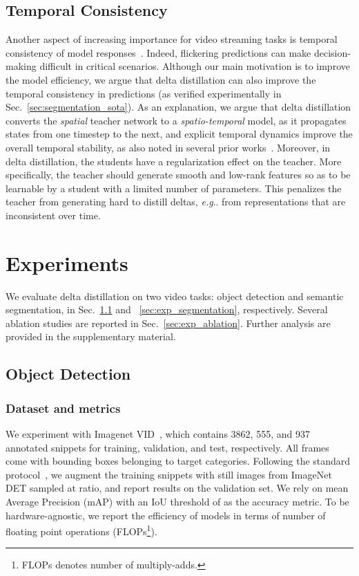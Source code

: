 \documentclass[runningheads]{llncs}
\makeatletter
\DeclareRobustCommand\onedot{\futurelet\@let@token\@onedot}
\def\@onedot{\ifx\@let@token.\else.\null\fi\xspace}
\def\eg{\emph{e.g}\onedot} \def\Eg{\emph{E.g}\onedot}
\makeatother
\begin{document}
\subsection{Temporal Consistency}
\label{sec:tc}
Another aspect of increasing importance for video streaming tasks is temporal consistency of model responses~\cite{lei2020blind,liu2020efficient,Rebol_2020_ACVRW}. Indeed, flickering predictions can make decision-making difficult in critical scenarios.
Although our main motivation is to improve the model efficiency, we argue that delta distillation can also improve the temporal consistency in predictions (as verified experimentally in Sec.~\ref{sec:segmentation_sota}).
As an explanation, we argue that delta distillation converts the \emph{spatial} teacher network to a \emph{spatio-temporal} model, as it propagates states from one timestep to the next, and explicit temporal dynamics improve the overall temporal stability, as also noted in several prior works~\cite{Rebol_2020_ACVRW,sibechi2019exploiting}.
Moreover, in delta distillation, the students have a regularization effect on the teacher.
More specifically, the teacher should generate smooth and low-rank features so as to be learnable by a student with a limited number of parameters. 
This penalizes the teacher from generating hard to distill deltas, \eg from representations that are inconsistent over time. \section{Experiments}
\label{sec:experiments}
We evaluate delta distillation on two video tasks: object detection and semantic segmentation, in Sec.~\ref{sec:exp_detection} and ~\ref{sec:exp_segmentation}, respectively. Several ablation studies are reported in Sec.~\ref{sec:exp_ablation}. Further analysis are provided in the supplementary material.
\subsection{Object Detection}
\label{sec:exp_detection}
\subsubsection{Dataset and metrics}
We experiment with Imagenet VID~\cite{vid}, which contains 3862, 555, and 937 annotated snippets for training, validation, and test, respectively. All frames come with bounding boxes belonging to  target categories.
Following the standard protocol~\cite{mega,flow_guided,fgfa,zhu17dff}, we augment the training snippets with still images from ImageNet DET sampled at  ratio, and report results on the validation set. We rely on mean Average Precision (mAP) with an IoU threshold of  as the accuracy metric.
To be hardware-agnostic, we report the efficiency of models in terms of number of floating point operations (FLOPs\footnote{FLOPs denotes number of multiply-adds.}).
\end{document}

